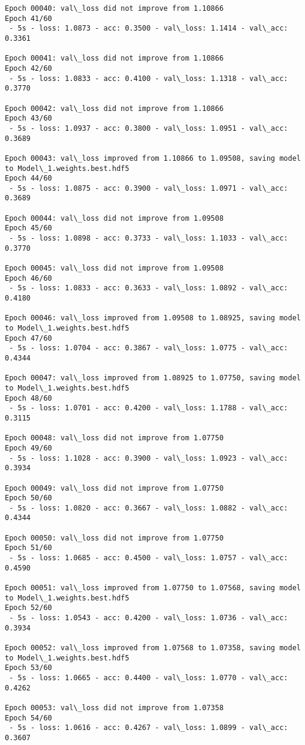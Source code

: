 \documentclass[11pt]{article}
\begin{document}
\begin{Verbatim}[commandchars=\\\{\}]
Epoch 00040: val\_loss did not improve from 1.10866
Epoch 41/60
 - 5s - loss: 1.0873 - acc: 0.3500 - val\_loss: 1.1414 - val\_acc: 0.3361

Epoch 00041: val\_loss did not improve from 1.10866
Epoch 42/60
 - 5s - loss: 1.0833 - acc: 0.4100 - val\_loss: 1.1318 - val\_acc: 0.3770

Epoch 00042: val\_loss did not improve from 1.10866
Epoch 43/60
 - 5s - loss: 1.0937 - acc: 0.3800 - val\_loss: 1.0951 - val\_acc: 0.3689

Epoch 00043: val\_loss improved from 1.10866 to 1.09508, saving model to Model\_1.weights.best.hdf5
Epoch 44/60
 - 5s - loss: 1.0875 - acc: 0.3900 - val\_loss: 1.0971 - val\_acc: 0.3689

Epoch 00044: val\_loss did not improve from 1.09508
Epoch 45/60
 - 5s - loss: 1.0898 - acc: 0.3733 - val\_loss: 1.1033 - val\_acc: 0.3770

Epoch 00045: val\_loss did not improve from 1.09508
Epoch 46/60
 - 5s - loss: 1.0833 - acc: 0.3633 - val\_loss: 1.0892 - val\_acc: 0.4180

Epoch 00046: val\_loss improved from 1.09508 to 1.08925, saving model to Model\_1.weights.best.hdf5
Epoch 47/60
 - 5s - loss: 1.0704 - acc: 0.3867 - val\_loss: 1.0775 - val\_acc: 0.4344

Epoch 00047: val\_loss improved from 1.08925 to 1.07750, saving model to Model\_1.weights.best.hdf5
Epoch 48/60
 - 5s - loss: 1.0701 - acc: 0.4200 - val\_loss: 1.1788 - val\_acc: 0.3115

Epoch 00048: val\_loss did not improve from 1.07750
Epoch 49/60
 - 5s - loss: 1.1028 - acc: 0.3900 - val\_loss: 1.0923 - val\_acc: 0.3934

Epoch 00049: val\_loss did not improve from 1.07750
Epoch 50/60
 - 5s - loss: 1.0820 - acc: 0.3667 - val\_loss: 1.0882 - val\_acc: 0.4344

Epoch 00050: val\_loss did not improve from 1.07750
Epoch 51/60
 - 5s - loss: 1.0685 - acc: 0.4500 - val\_loss: 1.0757 - val\_acc: 0.4590

Epoch 00051: val\_loss improved from 1.07750 to 1.07568, saving model to Model\_1.weights.best.hdf5
Epoch 52/60
 - 5s - loss: 1.0543 - acc: 0.4200 - val\_loss: 1.0736 - val\_acc: 0.3934

Epoch 00052: val\_loss improved from 1.07568 to 1.07358, saving model to Model\_1.weights.best.hdf5
Epoch 53/60
 - 5s - loss: 1.0665 - acc: 0.4400 - val\_loss: 1.0770 - val\_acc: 0.4262

Epoch 00053: val\_loss did not improve from 1.07358
Epoch 54/60
 - 5s - loss: 1.0616 - acc: 0.4267 - val\_loss: 1.0899 - val\_acc: 0.3607


\end{Verbatim}
\end{document}
